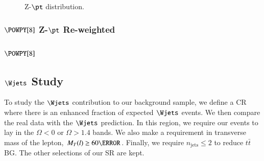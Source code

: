 \begin{figure}[htbp]
	\centering
	\hfill
	\caption{Z-$\pt$ distribution.}
	\label{AFig13S}
\end{figure}

\subsubsection{$\POWPY[8]$ Z-$\pt$ Re-weighted}


\subsubsection{$\POWPY[8]$}





\subsection{$\Wjets$ Study}\label{wjetsstudy}
To study the $\Wjets$ contribution to our background sample, we define a CR where there is an enhanced fraction of expected $\Wjets$ events. We then compare the real data with the  $\Wjets$ prediction. In this region, we require our events to lay in the $\Omega<0$ or $\Omega>1.4$ bands. We also make a requirement in transverse mass of the lepton, $M_T(l)\ge 60 \GeV$. Finally, we require $n_{\text{jets}}\le 2$ to reduce $t\bar{t}$ BG. The other selections of our SR are kept.


